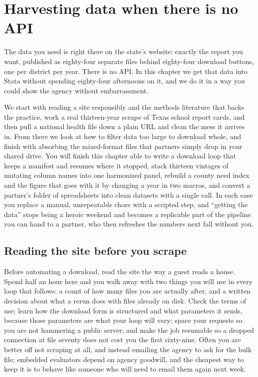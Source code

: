 \chapter{Harvesting data when there is no API}\label{ch:noapi}

The data you need is right there on the state's website: exactly the report you want, published as eighty-four separate files behind eighty-four download buttons, one per district per year. There is no API. In this chapter we get that data into Stata without spending eighty-four afternoons on it, and we do it in a way you could show the agency without embarrassment.

We start with reading a site responsibly and the methods literature that backs the practice, work a real thirteen-year scrape of Texas school report cards, and then pull a national health file down a plain URL and clean the mess it arrives in. From there we look at how to filter data too large to download whole, and finish with absorbing the mixed-format files that partners simply drop in your shared drive. You will finish this chapter able to write a download loop that keeps a manifest and resumes where it stopped, stack thirteen vintages of mutating column names into one harmonized panel, rebuild a county need index and the figure that goes with it by changing a year in two macros, and convert a partner's folder of spreadsheets into clean datasets with a single call. In each case you replace a manual, unrepeatable chore with a scripted step, and \enquote{getting the data} stops being a heroic weekend and becomes a replicable part of the pipeline you can hand to a partner, who then refreshes the numbers next fall without you.

\section{Reading the site before you scrape}
Before automating a download, read the site the way a guest reads a house. Spend half an hour here and you walk away with two things you will use in every loop that follows: a count of how many files you are actually after, and a written decision about what a rerun does with files already on disk. Check the terms of use; learn how the download form is structured and what parameters it sends, because those parameters are what your loop will vary; space your requests so you are not hammering a public server; and make the job resumable so a dropped connection at file seventy does not cost you the first sixty-nine. Often you are better off not scraping at all, and instead emailing the agency to ask for the bulk file; embedded evaluators depend on agency goodwill, and the cheapest way to keep it is to behave like someone who will need to email them again next week.

